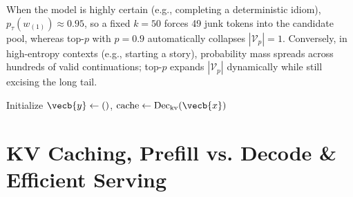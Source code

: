 \documentclass[../../../../master.tex]{subfiles}
\begin{document}
\begin{intuition}
When the model is highly certain (e.g., completing a deterministic idiom), $p_{\tau}(w_{(1)}) \approx 0.95$, so a fixed $k = 50$ forces 49 junk tokens into the candidate pool, whereas top-$p$ with $p = 0.9$ automatically collapses $|\mathcal{V}_p| = 1$. Conversely, in high-entropy contexts (e.g., starting a story), probability mass spreads across hundreds of valid continuations; top-$p$ expands $|\mathcal{V}_p|$ dynamically while still excising the long tail.
\end{intuition}

\begin{algorithm}[htbp]
\caption{Temperature-Scaled Top-$k$ / Top-$p$ Nucleus Sampling}\label{alg:decode:nucleus}
\KwIn{Context $\vecb{x}$, model $\theta$, temperature $\tau \ge 0$, top-$k$ bound $k \le |\mathcal{V}|$, nucleus $p \in (0, 1]$, max tokens $n_{\max}$}
Initialize $\vecb{y} \leftarrow ()$, $\mathrm{cache} \leftarrow \mathrm{Dec}_{\mathrm{kv}}(\vecb{x})$ 
\end{algorithm}

\section{KV Caching, Prefill vs. Decode \& Efficient Serving}\label{sec:decode:kv_cache}
\end{document}
